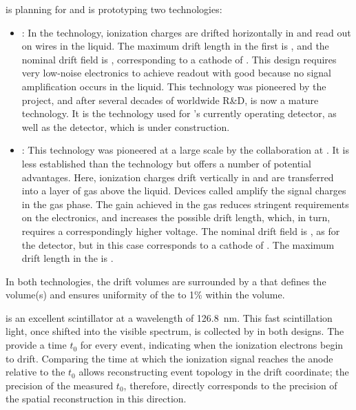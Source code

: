  is planning for and is prototyping two  technologies:
\begin{itemize}
\item {}: In the  technology, ionization charges are drifted horizontally in  and read out on wires in the liquid.  The maximum drift length in the first   is \spmaxdrift, and the nominal drift field is \spmaxfield, corresponding to a cathode  of \sptargetdriftvoltpos. This design requires very low-noise electronics to achieve readout with good  because no signal amplification occurs in the liquid. This technology was pioneered by the  project, and after several decades of worldwide R\&D, is now a mature technology. It is the technology used for 's currently operating  detector, as well as the  detector, which is under construction. 

\item {}: This technology was pioneered at a large scale by the  collaboration at . It is less established than the  technology but offers a number of potential advantages. Here, ionization charges drift vertically in  and are transferred into a layer of gas above the liquid. Devices called  amplify the signal charges  in the gas phase. The gain achieved in the gas reduces stringent requirements on the electronics, and increases the possible drift length, which, in turn, requires a correspondingly higher voltage. The nominal drift field is \dpnominaldriftfield, as for the  detector, but in this case corresponds to a cathode  of \dptargetdriftvoltpos.
The maximum drift length in the  is \dpmaxdrift{}.  
\end{itemize}
In both technologies, the drift volumes are surrounded by a  that defines the volume(s) and ensures uniformity of the \efield to 1\% within the volume.

 is an excellent scintillator at a wavelength of \SI{126.8}{\nano\meter}. This fast scintillation light, once shifted into the visible spectrum, is collected by  in both designs. The  provide a time $t_{0}$ for every event, indicating when the ionization electrons begin to drift. Comparing the time at which the ionization signal reaches the anode relative to the $t_{0}$ allows reconstructing event topology in the drift coordinate; the precision of the measured $t_{0}$, therefore, directly corresponds to the precision of the spatial reconstruction in this direction. 

